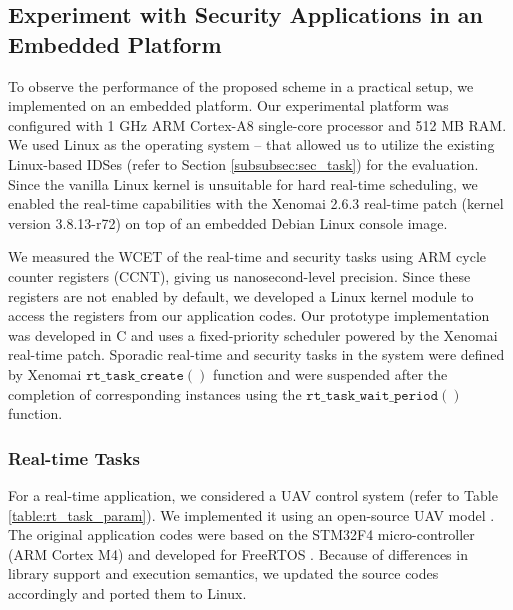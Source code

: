 \documentclass[../rt_server_main.tex]{subfiles}
\begin{document}
\subsection{Experiment with Security Applications in an Embedded Platform} \label{subsec:implementation_BBB}

To observe the performance of the proposed scheme in a practical setup, we implemented \coolname on an embedded platform. %
Our experimental platform \cite{bbb} was configured with 1 GHz ARM Cortex-A8 single-core processor and 512 MB RAM. We used Linux as the operating system -- that allowed us to utilize the existing Linux-based IDSes (refer to Section \ref{subsubsec:sec_task}) for the evaluation. Since the vanilla Linux kernel is  unsuitable for hard real-time scheduling, we enabled the real-time capabilities with the Xenomai \cite{xenomai} 2.6.3 real-time patch (kernel version 3.8.13-r72) on top of an embedded Debian Linux console image. 

We measured the WCET of the real-time and security tasks using ARM cycle counter registers (\eg CCNT), giving us nanosecond-level precision. Since these registers are not enabled by default, we developed a Linux kernel module to access the registers from our application codes.
Our prototype implementation was developed in C and uses a fixed-priority scheduler powered by the Xenomai real-time patch. Sporadic real-time and security tasks in the system were defined by Xenomai $\mathtt{rt\_task\_create()}$ function and were 
suspended after the completion of corresponding instances using the $\mathtt{rt\_task\_wait\_period()}$ function.




\subsubsection{Real-time Tasks}

For a real-time application, we considered a UAV control system (refer to Table \ref{table:rt_task_param}). %
We implemented it using an open-source UAV model \cite{khan-drone}. 
The original application codes were based on the STM32F4  micro-controller (ARM Cortex M4) and developed for FreeRTOS \cite{free_rtos}. Because of differences in library support and execution semantics, we updated the source codes accordingly and ported them to Linux.
\end{document}
